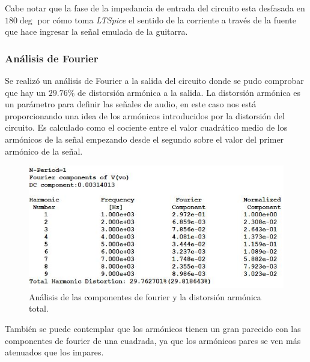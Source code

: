 Cabe notar que la fase de la impedancia de entrada del circuito esta desfasada en $180\deg$ por cómo toma \textit{LTSpice} el sentido de la corriente a través de la fuente que hace ingresar la señal emulada de la guitarra.

\subsubsection{Análisis de Fourier}

Se realizó un análisis de Fourier a la salida del circuito donde se pudo comprobar que hay un $29.76\%$ de distorsión armónica a la salida. La distorsión armónica es un parámetro para definir las señales de audio, en este caso nos está proporcionando una idea de los armónicos introducidos por la distorsión del circuito. Es calculado como el cociente entre el valor cuadrático medio de los armónicos de la señal empezando desde el segundo sobre el valor del primer armónico de la señal.
\begin{figure}[H]
	\centering
	\includegraphics[width=1\textwidth, trim={0 0 0 0}, clip]{Ejercicio5/Imagenes/Circuito_base/Sim/sim_base_fourier.JPG}
	\caption{Análisis de las componentes de fourier y la distorsión armónica total.}
	\label{fig:sim_base_fourier}
\end{figure}
También se puede contemplar que los armónicos tienen un gran parecido con las componentes de fourier de una cuadrada, ya que los armónicos pares se ven más atenuados que los impares.

